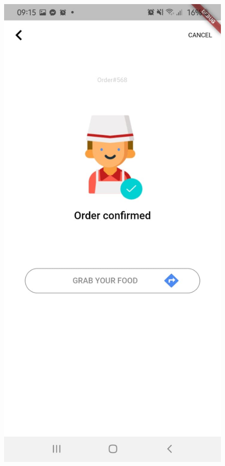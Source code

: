 \documentclass[french, a4paper, 12pt]{report}
\begin{document}
\begin{figure}[h!]
  \includegraphics[width=\linewidth]{screenshots/ClientViews/orderconfirm.jpg}

\end{figure}
\end{document}
